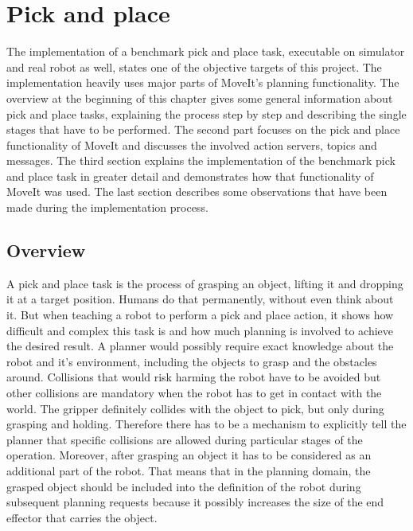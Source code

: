 
\chapter{Pick and place}
\label{chap:pick_place}

The implementation of a benchmark pick and place task, executable on simulator and real robot as well, states one of the objective targets of this project. The implementation heavily uses major parts of MoveIt's planning functionality. The overview at the beginning of this chapter gives some general information about pick and place tasks, explaining the process step by step and describing the single stages that have to be performed. The second part focuses on the pick and place functionality of MoveIt and discusses the involved action servers, topics and messages. The third section explains the implementation of the benchmark pick and place task in greater detail and demonstrates how that functionality of MoveIt was used. The last section describes some observations that have been made during the implementation process.

\section{Overview}

A pick and place task is the process of grasping an object, lifting it and dropping it at a target position. Humans do that permanently, without even think about it. But when teaching a robot to perform a pick and place action, it shows how difficult and complex this task is and how much planning is involved to achieve the desired result. A planner would possibly require exact knowledge about the robot and it's environment, including the objects to grasp and the obstacles around. Collisions that would risk harming the robot have to be avoided but other collisions are mandatory when the robot has to get in contact with the world. The gripper definitely collides with the object to pick, but only during grasping and holding. Therefore there has to be a mechanism to explicitly tell the planner that specific collisions are allowed during particular stages of the operation. Moreover, after grasping an object it has to be considered as an additional part of the robot. That means that in the planning domain, the grasped object should be included into the definition of the robot during subsequent planning requests because it possibly increases the size of the end effector that carries the object. \\

